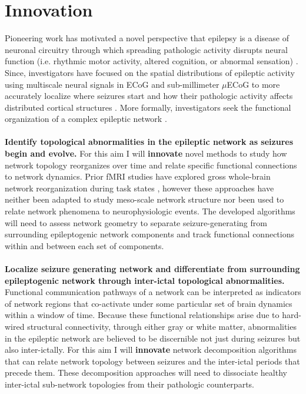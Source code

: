 \section{Innovation}
Pioneering work has motivated a novel perspective that epilepsy is a disease of neuronal circuitry through which spreading pathologic activity disrupts neural function (i.e. rhythmic motor activity, altered cognition, or abnormal sensation) \cite{kutsy1999ictal, spencer2002neural}. Since, investigators have focused on the spatial distributions of epileptic activity using multiscale neural signals in ECoG and sub-millimeter $\mu$ECoG to more accurately localize where seizures start and how their pathologic activity affects distributed cortical structures \cite{worrell2008high-frequency, schevon2009spatial, stead2010microseizures, viventi2011flexible, feldt_muldoon2013spatially, weiss2013ictal}. More formally, investigators seek the functional organization of a complex epileptic network \cite{spencer2002neural, kramer2012epilepsy, lehnertz2014evolving}.
~\\
~\\
 \textbf{Identify topological abnormalities in the epileptic network as seizures begin and evolve.}
For this aim I will \textbf{innovate} novel methods to study how network topology reorganizes over time and relate specific functional connections to network dynamics. Prior fMRI studies have explored gross whole-brain network reorganization during task states \cite{bassett2006adaptive, bassett2011dynamic}, however these approaches have neither been adapted to study meso-scale network structure nor been used to relate network phenomena to neurophysiologic events. The developed algorithms will need to assess network geometry to separate seizure-generating from surrounding epileptogenic network components and track functional connections \cite{holme2012temporal} within and between each set of components.
~\\
~\\
 \textbf{Localize seizure generating network and differentiate from surrounding epileptogenic network through inter-ictal topological abnormalities.}
Functional communication pathways of a network can be interpreted as indicators of network regions that co-activate under some particular set of brain dynamics within a window of time. Because these functional relationships arise due to hard-wired structural connectivity, through either gray or white matter, abnormalities in the epileptic network are believed to be discernible not just during seizures but also inter-ictally. For this aim I will \textbf{innovate} network decomposition algorithms that can relate network topology between seizures and the inter-ictal periods that precede them. These decomposition approaches will need to dissociate healthy inter-ictal sub-network topologies from their pathologic counterparts.
